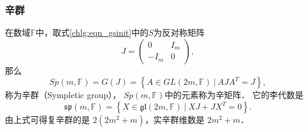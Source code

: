 \subsubsection{辛群}
在数域$\mathbb{F}$中，取式\eqref{chlg:eqn_gsinit}中的$S$为反对称矩阵
\begin{equation}
    J = \begin{pmatrix}
            0 & I_m \\ -I_m & 0
        \end{pmatrix},
\end{equation}
那么
\begin{equation}
    Sp(m,\mathbb{F})=G(J)= \left\{ A \in GL(2m,\mathbb{F})\ |\ A J {A}^T =J \right\},
\end{equation}
称为{\heiti 辛群}（Sympletic group），
$Sp(m,\mathbb{F})$中的元素称为{\heiti 辛矩阵}．
它的李代数是
\begin{equation}
    \mathfrak{sp}(m,\mathbb{F})= \left\{ X \in 
    \mathfrak{gl}(2m,\mathbb{F})\ |\ X J + J {X}^T =0 \right\}.
\end{equation}
由上式可得复辛群的是 $2(2m^2+m)$，实辛群维数是 $2m^2+m$．





